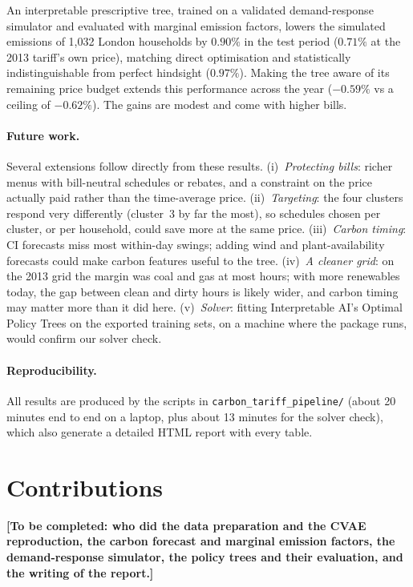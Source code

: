 \documentclass[11pt]{article}
\newcommand{\pct}[1]{$#1\%$}
\begin{document}
An interpretable prescriptive tree, trained on a validated demand-response simulator and evaluated with marginal
emission factors, lowers the simulated emissions of 1,032 London households by \pct{0.90} in the test period
(\pct{0.71} at the 2013 tariff's own price), matching direct optimisation and statistically indistinguishable from
perfect hindsight (\pct{0.97}). Making the tree aware of
its remaining price budget extends this performance across the year (\pct{-0.59} vs a ceiling of \pct{-0.62}). The
gains are modest and come with higher bills.

\paragraph{Future work.} Several extensions follow directly from these results. (i)~\emph{Protecting bills}: richer
menus with bill-neutral schedules or rebates, and a constraint on the price actually paid rather than the time-average
price. (ii)~\emph{Targeting}: the four clusters respond very differently (cluster~3 by far the most), so schedules
chosen per cluster, or per household, could save more at the same price. (iii)~\emph{Carbon timing}: CI forecasts
miss most within-day swings; adding wind and plant-availability forecasts could make carbon features useful to the
tree. (iv)~\emph{A cleaner grid}: on the 2013 grid the margin was coal and gas at most hours; with more renewables
today, the gap between clean and dirty hours is likely wider, and carbon timing may matter more than it did here.
(v)~\emph{Solver}: fitting Interpretable AI's Optimal Policy Trees on the exported training sets, on a machine where
the package runs, would confirm our solver check.

\paragraph{Reproducibility.} All results are produced by the scripts in \texttt{carbon\_tariff\_pipeline/}
(about 20 minutes end to end on a laptop, plus about 13 minutes for the solver check), which also generate a detailed HTML report with every table.

\section*{Contributions}
\textbf{[To be completed: who did the data preparation and the CVAE reproduction, the carbon forecast and marginal
emission factors, the demand-response simulator, the policy trees and their evaluation, and the writing of the
report.]}
\end{document}

